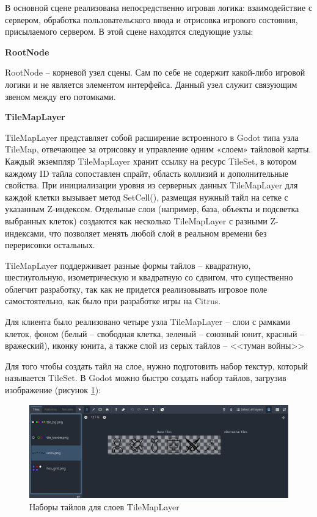             В основной сцене реализована непосредственно игровая логика: взаимодействие с сервером, обработка пользовательского ввода и отрисовка игрового состояния,
            присылаемого сервером. В этой сцене находятся следующие узлы:

            \textbf{RootNode}

            RootNode -- корневой узел сцены. Сам по себе не содержит какой-либо игровой логики и не является элементом интерфейса. Данный узел служит связующим звеном между его потомками. 
            
            \textbf{TileMapLayer}

            TileMapLayer представляет собой расширение встроенного в Godot типа узла TileMap, отвечающее за отрисовку и управление одним «слоем» тайловой карты. Каждый экземпляр TileMapLayer 
            хранит ссылку на ресурс TileSet, в котором каждому ID тайла сопоставлен спрайт, область коллизий и дополнительные свойства. При инициализации уровня из серверных 
            данных TileMapLayer для каждой клетки вызывает метод SetCell(), размещая нужный тайл на сетке с указанным Z-индексом. 
            Отдельные слои (например, база, объекты и подсветка выбранных клеток) создаются как несколько TileMapLayer с разными Z-индексами, что позволяет менять любой слой в 
            реальном времени без перерисовки остальных.

            TileMapLayer поддерживает разные формы тайлов -- квадратную, шестиугольную, изометрическую и квадратную со сдвигом, что существенно облегчит разработку, так как не придется
            реализовывать игровое поле самостоятельно, как было при разработке игры на Citrus.

            Для клиента было реализовано четыре узла TileMapLayer -- слои с рамками клеток, фоном (белый -- свободная клетка, зеленый -- союзный юнит, красный -- вражеский), 
            иконку юнита, а также слой из серых тайлов -- <<туман войны>>

            Для того чтобы создать тайл на слое, нужно подготовить набор текстур, который называется TileSet. В Godot можно быстро создать набор тайлов, загрузив изображение (рисунок \ref{ris2.4}):
            \begin{figure}[H]
                \centering
                \includegraphics[width=\textwidth]{pictures/godot_tileset.png}
                \caption{Наборы тайлов для слоев TileMapLayer}\label{ris2.4}
            \end{figure}

